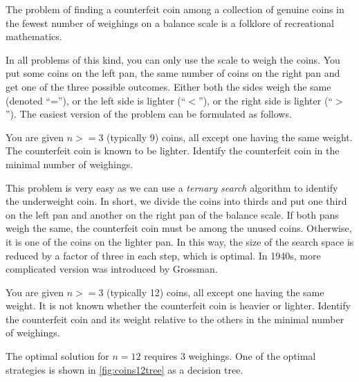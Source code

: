 The problem of finding a counterfeit coin among
  a collection of genuine coins in the fewest
  number of weighings on a balance scale is a folklore of
  recreational mathematics.

In all problems of this kind, you can only use the scale to weigh the coins.
You put some coins on the left pan, the same number of coins on the right pan
  and get one of the three possible outcomes.
Either both the sides weigh the same (denoted ``=''),
  or the left side is lighter (``$<$''),
  or the right side is lighter (``$>$'').
The easiest version of the problem can be formulated as follows.

\begin{problem} \label{pr:coins9}
You are given $n >= 3$ (typically 9) coins, all except one having the same weight.
The counterfeit coin is known to be lighter.
Identify the counterfeit coin in the minimal number of weighings.
\end{problem}

This problem is very easy as we can use a \emph{ternary search} algorithm
  to identify the underweight coin.
In short, we divide the coins into thirds and put one third on the left pan and
  another on the right pan of the balance scale.
If both pans weigh the same, the counterfeit coin must be among the unused coins.
Otherwise, it is one of the coins on the lighter pan.
In this way, the size of the search space is reduced
  by a factor of three in each step, which is optimal.
In 1940s, more complicated version was introduced by Grossman\cite{coins-grossman1945}.

\begin{problem} \label{pr:coins12}
You are given $n >= 3$ (typically 12) coins, all except one having the same weight.
It is not known whether the counterfeit coin is heavier or lighter.
Identify the counterfeit coin and its weight relative to the others
  in the minimal number of weighings.
\end{problem}

The optimal solution for $n=12$ requires 3 weighings.
One of the optimal
  strategies is shown in \autoref{fig:coins12tree} as a decision tree.

